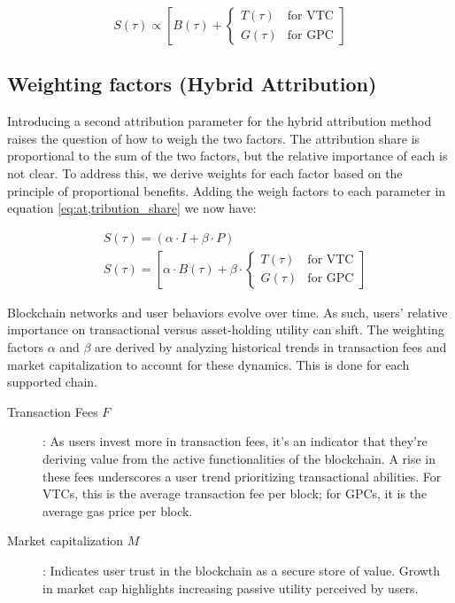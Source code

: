 \documentclass[11pt]{report}
\begin{document}
\begin{equation}
    S(\tau) \propto \left[B(\tau) + \begin{cases}
            T(\tau) & \text{for VTC} \\
            G(\tau) & \text{for GPC}
        \end{cases}\right]
    \label{eq:attribution_share_chain_type}
\end{equation}

\subsection{Weighting factors (Hybrid Attribution)}

Introducing a second attribution parameter for the hybrid attribution method raises the question of how to weigh the two factors. The attribution share is proportional to the sum of the two factors, but the relative importance of each is not clear. To address this, we derive weights for each factor based on the principle of proportional benefits. Adding the weigh factors to each parameter in equation \ref{eq:at,tribution_share} we now have:

\begin{align}
     & S(\tau) = (\alpha \cdot I + \beta \cdot P)                                  \\
     & S(\tau) = \left[\alpha \cdot B(\tau) + \beta \cdot \begin{cases}
                                                                  T(\tau) & \text{for VTC} \\
                                                                  G(\tau) & \text{for GPC}
                                                              \end{cases}\right]
    \label{eq:attribution_factors}
\end{align}



Blockchain networks and user behaviors evolve over time. As such, users' relative importance on transactional versus asset-holding utility can shift. The weighting factors $\alpha$ and $\beta$ are derived by analyzing historical trends in transaction fees and market capitalization to account for these dynamics. This is done for each supported chain.

\begin{description}
    \item[Transaction Fees $F$]: As users invest more in transaction fees, it's an indicator that they're deriving value from the active functionalities of the blockchain. A rise in these fees underscores a user trend prioritizing transactional abilities. For \ac{VTC}s, this is the average transaction fee per block; for \ac{GPC}s, it is the average gas price per block.
    \item[Market capitalization $M$]: Indicates user trust in the blockchain as a secure store of value. Growth in market cap highlights increasing passive utility perceived by users.
\end{description}
\end{document}
